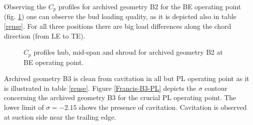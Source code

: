 Observing the $C_p$ profiles for archived geometry B2 for the BE operating point (fig. \ref{Francis-B2-LOAD}) one can observe the bud loading quality, as it is depicted also in table \ref{reuse}. For all three positions there are big load differences along the chord direction (from LE to TE). 

\begin{figure}[h!]
\begin{minipage}[b]{1\linewidth}
 \centering
\end{minipage}
\caption{$C_p$ profiles hub, mid-span and shroud for archived geometry B2 at BE operating point.}
\label{Francis-B2-LOAD}
\end{figure}

Archived geometry B3 is clean from cavitation in all but PL operating point as it is illustrated in table \ref{reuse}. Figure \ref{Francis-B3-PL} depicts the $\sigma$ contour concerning the archived geometry B3 for the crucial PL operating point. The lower limit of $\sigma = -2.15$ shows the presence of cavitation. Cavitation is observed at suction side near the trailing edge.     


